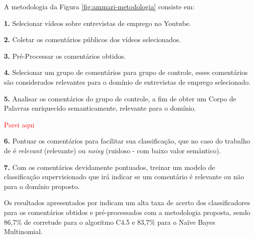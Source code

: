 A metodologia da Figura \ref{fig:ammari-metodologia} consiste em:

\textbf{1.} Selecionar vídeos sobre entrevistas de emprego no Youtube.

\textbf{2.} Coletar os comentários públicos dos vídeos selecionados.

\textbf{3.} Pré-Processar os comentários obtidos.

\textbf{4.} Selecionar um grupo de comentários para grupo de controle, esses comentários são considerados relevantes para o domínio de entrevistas de emprego selecionado.

\textbf{5.} Analisar os comentários do grupo de controle, a fim de obter um Corpo de Palavras enriquecido semanticamente, relevante para o domínio.

\textcolor{red}{Parei aqui}

\textbf{6.} Pontuar os comentários para facilitar sua classificação, que no caso do trabalho de  é \textit{relevant} (relevante) ou \textit{noisy} (ruidoso - com baixo valor semântico).

\textbf{7.} Com os comentários devidamente pontuados, treinar um modelo de classificação supervisionado que irá indicar se um comentário é relevante ou não para o domínio proposto.

Os resultados apresentados por  indicam um alta taxa de acerto dos classificadores para os comentários obtidos e pré-processados com a metodologia proposta, sendo 86,7\% de corretude para o algoritmo C4.5 e 83,7\% para o Naïve Bayes Multinomial.

